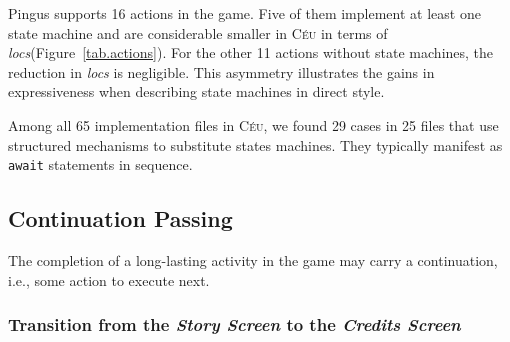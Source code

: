 \documentclass{vgtc}                          %
\newcommand{\CEU}{\textsc{C\'{e}u}\xspace}
\newcommand{\locs}{\emph{locs}\xspace}
\newcommand{\code}[1] {{\small{\texttt{#1}}}}
\begin{document}
Pingus supports 16 actions in the game.
Five of them implement at least one state machine and are considerable smaller
in \CEU in terms of \locs (Figure~\ref{tab.actions}).
%
For the other 11 actions without state machines, the reduction in \locs is
negligible.
%
This asymmetry illustrates the gains in expressiveness when describing state
machines in direct style.


Among all 65 implementation files in \CEU, we found 29 cases in 25 files that
use structured mechanisms to substitute states machines.
They typically manifest as \code{await} statements in sequence.

\subsection{Continuation Passing}
\label{sec.pats.cps}

    The completion of a long-lasting activity in the game may carry a
    continuation, i.e., some action to execute next.

\subsubsection{ Transition from the \emph{Story Screen}  to the \emph{Credits Screen}}
\end{document}
